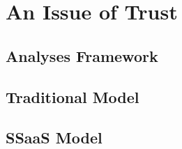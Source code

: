\chapter{An Issue of Trust}
\label{chap:trust}

\section{Analyses Framework}
\section{Traditional Model}
\section{SSaaS Model}
